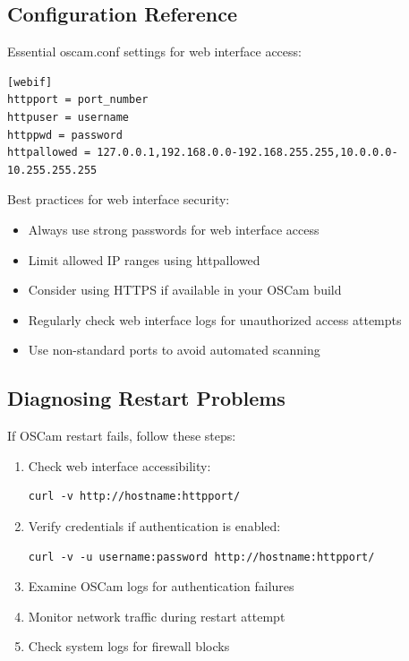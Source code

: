 \documentclass[a4paper,11pt]{report}
\begin{document}
\subsection{Configuration Reference}
Essential oscam.conf settings for web interface access:
\begin{verbatim}
[webif]
httpport = port_number
httpuser = username
httppwd = password
httpallowed = 127.0.0.1,192.168.0.0-192.168.255.255,10.0.0.0-10.255.255.255
\end{verbatim}

\begin{tipbox}
Best practices for web interface security:
\begin{itemize}
    \item Always use strong passwords for web interface access
    \item Limit allowed IP ranges using httpallowed
    \item Consider using HTTPS if available in your OSCam build
    \item Regularly check web interface logs for unauthorized access attempts
    \item Use non-standard ports to avoid automated scanning
\end{itemize}
\end{tipbox}

\subsection{Diagnosing Restart Problems}
\begin{procedurebox}
If OSCam restart fails, follow these steps:
\begin{enumerate}
    \item Check web interface accessibility:
    \begin{verbatim}
curl -v http://hostname:httpport/
    \end{verbatim}
    \item Verify credentials if authentication is enabled:
    \begin{verbatim}
curl -v -u username:password http://hostname:httpport/
    \end{verbatim}
    \item Examine OSCam logs for authentication failures
    \item Monitor network traffic during restart attempt
    \item Check system logs for firewall blocks
\end{enumerate}
\end{procedurebox}
\end{document}
